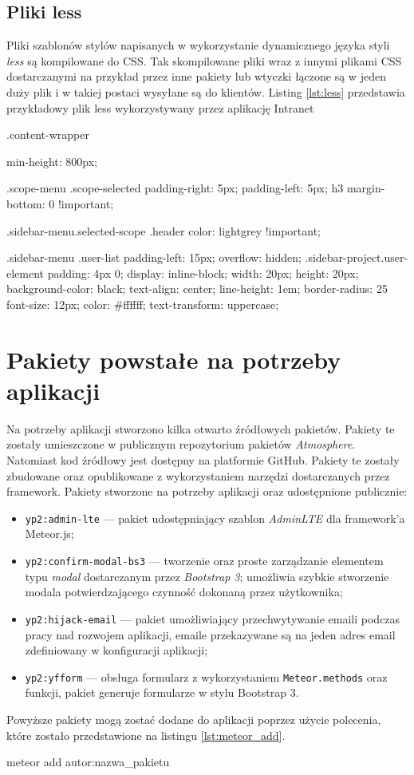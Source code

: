 \subsection{Pliki less}
Pliki szablonów stylów napisanych w wykorzystanie dynamicznego języka styli \emph{less} są kompilowane do CSS. Tak skompilowane pliki wraz z innymi plikami CSS dostarczanymi na przykład przez inne pakiety lub wtyczki łączone są w jeden duży plik i w takiej postaci wysyłane są do klientów. Listing \ref{lst:less} przedstawia przykładowy plik less wykorzystywany przez aplikację Intranet
\begin{css}[caption={Przykładowy plik less},label={lst:less}]
.content-wrapper {
  min-height: 800px;

}

.scope-menu {
  .scope-selected {
    padding-right: 5px;
    padding-left: 5px;
  }
  h3 {
    margin-bottom: 0 !important;
  }
}

.sidebar-menu.selected-scope {
  .header {
    color: lightgrey !important;
  }
}

.sidebar-menu {
  .user-list {
    padding-left: 15px;
    overflow: hidden;
    .sidebar-project.user-element {
      padding: 4px 0;
      display: inline-block;
      width: 20px;
      height: 20px;
      background-color: black;
      text-align: center;
      line-height: 1em;
      border-radius: 25%
      font-size: 12px;
      color: #ffffff;
      text-transform: uppercase;
    }
  }
}
\end{css}
  
\section{Pakiety powstałe na potrzeby aplikacji}
Na potrzeby aplikacji stworzono kilka otwarto źródłowych pakietów. Pakiety te zostały umieszczone w publicznym repozytorium pakietów \emph{Atmosphere}. Natomiast kod źródłowy jest dostępny na platformie GitHub. Pakiety te zostały zbudowane oraz opublikowane z wykorzystaniem narzędzi dostarczanych przez framework. Pakiety stworzone na potrzeby aplikacji oraz udostępnione publicznie:
\begin{itemize}
 \item \verb|yp2:admin-lte| --- pakiet udostępniający szablon \emph{AdminLTE} dla framework'a Meteor.js;
 \item \verb|yp2:confirm-modal-bs3| --- tworzenie oraz proste zarządzanie elementem typu \emph{modal} dostarczanym przez \emph{Bootstrap 3}; umożliwia szybkie stworzenie modala potwierdzającego czynność dokonaną przez użytkownika;
 \item \verb|yp2:hijack-email| --- pakiet umożliwiający przechwytywanie emaili podczas pracy nad rozwojem aplikacji, emaile przekazywane są na jeden adres email zdefiniowany w konfiguracji aplikacji;
 \item \verb|yp2:yfform| --- obsługa formularz z wykorzystaniem \verb|Meteor.methods| oraz funkcji, pakiet generuje formularze w stylu Bootstrap 3.
\end{itemize}

Powyższe pakiety mogą zostać dodane do aplikacji poprzez użycie polecenia, które zostało przedstawione na listingu \ref{lst:meteor_add}.
\begin{bash}[caption={Dodwanie pakietów do aplikacji},label={lst:meteor_add}]
meteor add autor:nazwa_pakietu
\end{bash}
